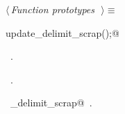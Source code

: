\documentclass{report}
\begin{document}
\begin{flushleft} \small
\begin{minipage}{\linewidth} \label{scrap72}
$\langle\,${\it Function prototypes}\nobreak\ {\footnotesize {}}$\,\rangle\equiv$
\vspace{-1ex}
\begin{list}{}{} \item
\mbox{}\verb@void update_delimit_scrap();@\\
\mbox{}\verb@@{\NWsep}
\end{list}
\vspace{-1ex}
\footnotesize\addtolength{\baselineskip}{-1ex}
\begin{list}{}{\setlength{\itemsep}{-\parsep}\setlength{\itemindent}{-\leftmargin}}
\item \NWtxtMacroDefBy\ .
\item \NWtxtMacroRefIn\ .
\end{list}
\vspace{-2ex}
\footnotesize\addtolength{\baselineskip}{-1ex}
\begin{list}{}{\setlength{\itemsep}{-\parsep}\setlength{\itemindent}{-\leftmargin}}
\item \NWtxtIdentsUsed\nobreak\  \verb@update_delimit_scrap@\nobreak\ .\end{list}
\end{minipage}\\[4ex]
\end{flushleft}
\end{document}
